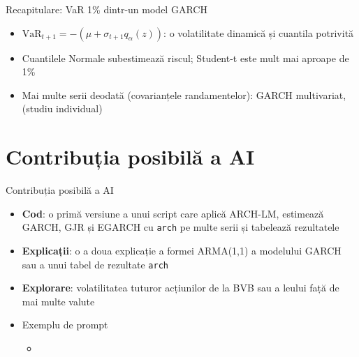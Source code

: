 \begin{frame}{Recapitulare: VaR 1\% dintr-un model GARCH}
\itemsize{\small}
\begin{itemize}
    \item $\mathrm{VaR}_{t+1} = -(\mu + \sigma_{t+1}q_\alpha(z))$: o volatilitate dinamică și cuantila potrivită
    \item Cuantilele Normale subestimează riscul; Student-t este mult mai aproape de 1\%
    \item Mai multe serii deodată (covarianțele randamentelor): GARCH multivariat,  (studiu individual)
\end{itemize}
\end{frame}


\section{Contribuția posibilă a AI}

\begin{frame}{Contribuția posibilă a AI}
\itemsize{\small}
\begin{itemize}
    \item \textbf{Cod}: o primă versiune a unui script care aplică ARCH-LM, estimează GARCH, GJR și EGARCH cu \texttt{arch} pe multe serii și tabelează rezultatele
    \item \textbf{Explicații}: o a doua explicație a formei ARMA(1,1) a modelului GARCH sau a unui tabel de rezultate \texttt{arch}
    \item \textbf{Explorare}: volatilitatea tuturor acțiunilor de la BVB sau a leului față de mai multe valute
    \item Exemplu de prompt
    \begin{itemize}
        \item {}
    \end{itemize}
\end{itemize}
\end{frame}

